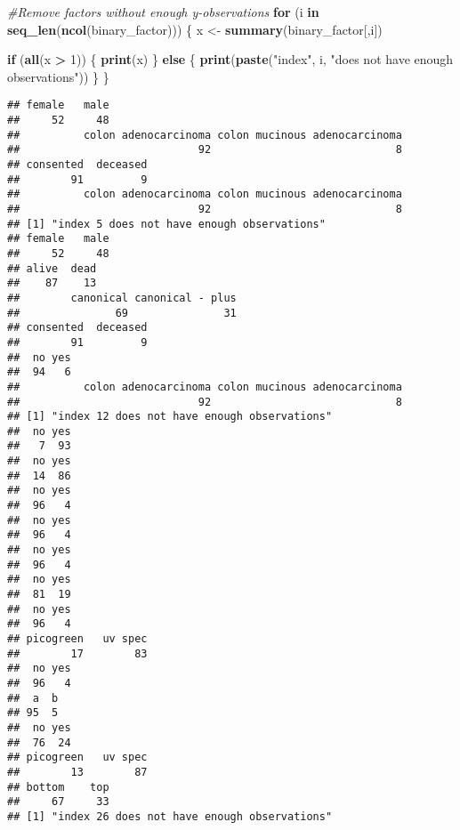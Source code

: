 \documentclass[
]{article}
\newenvironment{Shaded}{\begin{snugshade}}{\end{snugshade}}
\newcommand{\CommentTok}[1]{\textcolor[rgb]{0.56,0.35,0.01}{\textit{#1}}}
\newcommand{\ControlFlowTok}[1]{\textcolor[rgb]{0.13,0.29,0.53}{\textbf{#1}}}
\newcommand{\DecValTok}[1]{\textcolor[rgb]{0.00,0.00,0.81}{#1}}
\newcommand{\FunctionTok}[1]{\textcolor[rgb]{0.13,0.29,0.53}{\textbf{#1}}}
\newcommand{\NormalTok}[1]{#1}
\newcommand{\OtherTok}[1]{\textcolor[rgb]{0.56,0.35,0.01}{#1}}
\newcommand{\SpecialCharTok}[1]{\textcolor[rgb]{0.81,0.36,0.00}{\textbf{#1}}}
\newcommand{\StringTok}[1]{\textcolor[rgb]{0.31,0.60,0.02}{#1}}
\begin{document}
\begin{Shaded}
\begin{Highlighting}[]
\CommentTok{\#Remove factors without enough y{-}observations}
\ControlFlowTok{for}\NormalTok{ (i }\ControlFlowTok{in} \FunctionTok{seq\_len}\NormalTok{(}\FunctionTok{ncol}\NormalTok{(binary\_factor))) \{}
\NormalTok{  x }\OtherTok{\textless{}{-}} \FunctionTok{summary}\NormalTok{(binary\_factor[,i])}
  
  \ControlFlowTok{if}\NormalTok{ (}\FunctionTok{all}\NormalTok{(x }\SpecialCharTok{\textgreater{}} \DecValTok{1}\NormalTok{)) \{}
    \FunctionTok{print}\NormalTok{(x)}
\NormalTok{  \} }\ControlFlowTok{else}\NormalTok{ \{}
    \FunctionTok{print}\NormalTok{(}\FunctionTok{paste}\NormalTok{(}\StringTok{"index"}\NormalTok{, i, }\StringTok{"does not have enough observations"}\NormalTok{))}
\NormalTok{  \}}
\NormalTok{\}}
\end{Highlighting}
\end{Shaded}

\begin{verbatim}
## female   male 
##     52     48 
##          colon adenocarcinoma colon mucinous adenocarcinoma 
##                            92                             8 
## consented  deceased 
##        91         9 
##          colon adenocarcinoma colon mucinous adenocarcinoma 
##                            92                             8 
## [1] "index 5 does not have enough observations"
## female   male 
##     52     48 
## alive  dead 
##    87    13 
##        canonical canonical - plus 
##               69               31 
## consented  deceased 
##        91         9 
##  no yes 
##  94   6 
##          colon adenocarcinoma colon mucinous adenocarcinoma 
##                            92                             8 
## [1] "index 12 does not have enough observations"
##  no yes 
##   7  93 
##  no yes 
##  14  86 
##  no yes 
##  96   4 
##  no yes 
##  96   4 
##  no yes 
##  96   4 
##  no yes 
##  81  19 
##  no yes 
##  96   4 
## picogreen   uv spec 
##        17        83 
##  no yes 
##  96   4 
##  a  b 
## 95  5 
##  no yes 
##  76  24 
## picogreen   uv spec 
##        13        87 
## bottom    top 
##     67     33 
## [1] "index 26 does not have enough observations"
\end{verbatim}
\end{document}
